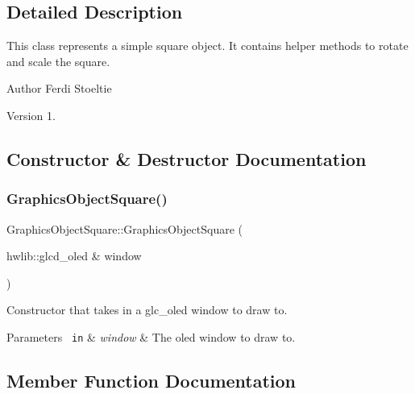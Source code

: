 \subsection{Detailed Description}
This class represents a simple square object. It contains helper methods to rotate and scale the square. 

\begin{DoxyAuthor}{Author}
Ferdi Stoeltie 
\end{DoxyAuthor}
\begin{DoxyVersion}{Version}
1. 
\end{DoxyVersion}


\subsection{Constructor \& Destructor Documentation}
\mbox{\label{class_graphics_object_square_af935eee79aab68a59befdf102f7f32a8}} 
\subsubsection{\texorpdfstring{GraphicsObjectSquare()}{GraphicsObjectSquare()}}
{\footnotesize\ttfamily Graphics\+Object\+Square\+::\+Graphics\+Object\+Square (\begin{DoxyParamCaption}\item[{hwlib\+::glcd\+\_\+oled \&}]{window }\end{DoxyParamCaption})\hspace{0.3cm}{\ttfamily [inline]}}



Constructor that takes in a glc\+\_\+oled window to draw to. 


\begin{DoxyParams}[1]{Parameters}
\mbox{\texttt{ in}}  & {\em window} & The oled window to draw to. \\
\hline
\end{DoxyParams}


\subsection{Member Function Documentation}
\mbox{\label{class_graphics_object_square_a92fc26cdb800858992f505a57f31e3aa}} 
